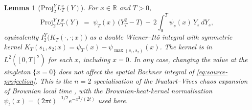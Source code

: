 \documentclass[11pt,reqno]{amsart}
\theoremstyle{plain}
\newtheorem{lemma}[theorem]{Lemma}
\theoremstyle{definition}
\theoremstyle{remark}
\newcommand{\R}{\mathbb{R}}
\newcommand{\Proj}{\mathrm{Proj}}
\newcommand{\Loc}{L}
\begin{document}
\begin{lemma}[$\Proj^Y_2 \Loc_T^x(Y)$]
\label{lem:proj2-LT}
For $x \in \R$ and $T > 0$,
\begin{equation}
  \Proj^Y_2 \Loc_T^x(Y)
   \;=\; \psi_T(x)\,\bigl(Y_T^2 - T\bigr)
        \,-\, 2 \int_0^T \psi_s(x)\,Y_s\,dY_s,
   \label{eq:proj2-LT}
\end{equation}
equivalently $I_2^Y\bigl(K_T(\cdot, \cdot; x)\bigr)$ as a double
Wiener--It\^o integral with symmetric kernel
$K_T(s_1, s_2; x) = \psi_T(x) - \psi_{\max(s_1, s_2)}(x)$. The kernel
is in $L^2([0, T]^2)$ for each $x$, including $x = 0$. In any case,
changing the value at the singleton $\{x = 0\}$ does not affect the
spatial Bochner integral of \eqref{eq:source-projection}. This is the
$n = 2$ specialisation of the Nualart--Vives chaos expansion of
Brownian local time \cite{NualartVives}, with the Brownian-heat-kernel
normalisation $\psi_t(x) = (2 \pi t)^{-1/2} e^{-x^2/(2t)}$ used here.
\end{lemma}
\end{document}
